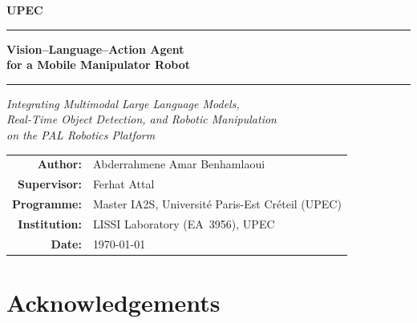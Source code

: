 \documentclass[12pt, a4paper, twoside]{report}
\begin{document}


\begin{titlepage}
  \centering
  \vspace*{1.5cm}

  {\large \textbf{UPEC} \par}
  \vspace{0.3cm}


  \rule{\linewidth}{1.5pt}\vspace{0.5cm}
  {\Huge\bfseries\color{darkblue}
    Vision--Language--Action Agent\\[0.4em]
    for a Mobile Manipulator Robot
  \par}
  \vspace{0.3cm}
  \rule{\linewidth}{0.8pt}

  \vspace{1.5cm}
  {\Large\itshape
    Integrating Multimodal Large Language Models,\\
    Real-Time Object Detection, and Robotic Manipulation\\
    on the PAL Robotics \tiago{} Platform
  \par}

  \vfill

  \begin{tabular}{rl}
    \textbf{Author:}      & Abderrahmene Amar Benhamlaoui \\[4pt]
    \textbf{Supervisor:}  & Ferhat Attal \\[4pt]
    \textbf{Programme:}   & Master IA2S, Universit\'e Paris-Est Cr\'eteil (UPEC) \\[4pt]
    \textbf{Institution:} & LISSI Laboratory (EA~3956), UPEC \\[4pt]
    \textbf{Date:}        & \today \\
  \end{tabular}

  \vspace{1.5cm}
\end{titlepage}

\cleardoublepage


\cleardoublepage
\chapter*{Acknowledgements}
\end{document}
